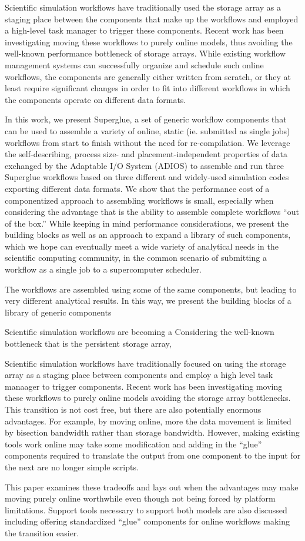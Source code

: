 Scientific simulation workflows have traditionally used
the storage array as a staging place between the components
that make up the workflows and employed a high-level
task manager to trigger these components.
Recent work has been investigating moving these
workflows to purely online models, thus avoiding the
well-known performance bottleneck of storage arrays.
While existing workflow management systems
can successfully organize and schedule such
online workflows, the components are generally
either written from scratch, or they at least require
significant changes in order to fit into different workflows
in which the components operate on different
data formats.

In this work, we present Superglue, a set of generic workflow
components that can be used to assemble a variety of online,
static (ie. submitted as single jobs) workflows from start to finish without
the need for re-compilation. We leverage the self-describing,
process size- and placement-independent properties of data exchanged
by the Adaptable I/O System (ADIOS) to assemble and run three
Superglue workflows based on three different and widely-used simulation
codes exporting different data formats.
We show that the performance cost of a componentized
approach to assembling workflows is small, especially when considering
the advantage that is the ability to assemble complete workflows
``out of the box.''
While keeping in mind performance considerations, we present the
building blocks as well as an approach to expand a library of such components,
which we hope can eventually meet a wide variety of analytical needs
in the scientific computing community, in the common scenario of
submitting a workflow as a single job to a supercomputer scheduler.


The workflows are assembled using
some of the same components, but leading to very different analytical results.
In this way, we present the building blocks of a library of generic components


Scientific simulation workflows are becoming a 
Considering the well-known bottleneck that is the persistent storage array,


Scientific simulation workflows have traditionally focused on using the storage
array as a staging place between components and employ a high level task
manaager to trigger components. Recent work has been investigating moving these
workflows to purely online models avoiding the storage array bottlenecks. This
transition is not cost free, but there are also potentially enormous advantages.
For example, by moving online, more the data movement is limited by bisection
bandwidth rather than storage bandwidth. However, making existing tools work
online may take some modification and adding in the ``glue'' components required
to translate the output from one component to the input for the next are no
longer simple scripts.

This paper examines these tradeoffs and lays out when the advantages may make
moving purely online worthwhile even though not being forced by platform
limitations. Support tools necessary to support both models are also discussed
including offering standardized ``glue'' components for online workflows making
the transition easier.
\endif
